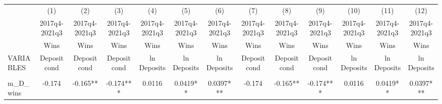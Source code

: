 \documentclass[]{article}
\begin{document}
\begin{center}
\begin{tabular}{lcccccccccccc} \hline
 & (1) & (2) & (3) & (4) & (5) & (6) & (7) & (8) & (9) & (10) & (11) & (12) \\
 & 2017q4-2021q3 & 2017q4-2021q3 & 2017q4-2021q3 & 2017q4-2021q3 & 2017q4-2021q3 & 2017q4-2021q3 & 2017q4-2021q3 & 2017q4-2021q3 & 2017q4-2021q3 & 2017q4-2021q3 & 2017q4-2021q3 & 2017q4-2021q3 \\
 & Wins & Wins & Wins & Wins & Wins & Wins & Wins & Wins & Wins & Wins & Wins & Wins \\
VARIABLES & Deposit cond & Deposit cond & Deposit cond & ln Deposits & ln Deposits & ln Deposits & Deposit cond & Deposit cond & Deposit cond & ln Deposits & ln Deposits & ln Deposits \\ \hline
\vspace{4pt} & \begin{footnotesize}\end{footnotesize} & \begin{footnotesize}\end{footnotesize} & \begin{footnotesize}\end{footnotesize} & \begin{footnotesize}\end{footnotesize} & \begin{footnotesize}\end{footnotesize} & \begin{footnotesize}\end{footnotesize} & \begin{footnotesize}\end{footnotesize} & \begin{footnotesize}\end{footnotesize} & \begin{footnotesize}\end{footnotesize} & \begin{footnotesize}\end{footnotesize} & \begin{footnotesize}\end{footnotesize} & \begin{footnotesize}\end{footnotesize} \\
m\_D\_wins & -0.174 & -0.165** & -0.174*** & 0.0116 & 0.0419** & 0.0397*** & -0.174 & -0.165** & -0.174*** & 0.0116 & 0.0419** & 0.0397*** \\

\end{tabular}
\end{center}
\end{document}
